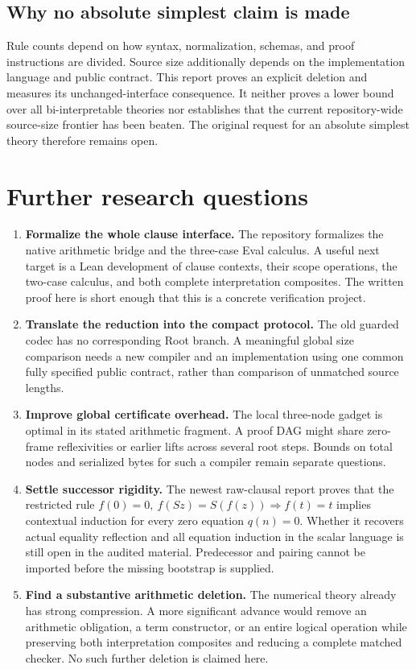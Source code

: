 \documentclass[11pt,letterpaper]{article}
\theoremstyle{definition}
\begin{document}
\subsection{Why no absolute simplest claim is made}

Rule counts depend on how syntax, normalization, schemas,
and proof instructions are divided. Source size additionally
depends on the implementation language and public contract.
This report proves an explicit deletion and measures its
unchanged-interface consequence. It neither proves a lower
bound over all bi-interpretable theories nor establishes that
the current repository-wide source-size frontier has been
beaten. The original request for an absolute simplest theory
therefore remains open.

\section{Further research questions}
\label{sec:further}

\begin{enumerate}
\item \textbf{Formalize the whole clause interface.}
      The repository formalizes the native arithmetic bridge
      and the three-case Eval calculus. A useful next target
      is a Lean development of clause contexts, their scope
      operations, the two-case calculus, and both complete
      interpretation composites. The written proof here is
      short enough that this is a concrete verification project.
\item \textbf{Translate the reduction into the compact protocol.}
      The old guarded codec has no corresponding Root branch.
      A meaningful global size comparison needs a new compiler
      and an implementation using one common fully specified
      public contract, rather than comparison of unmatched
      source lengths.
\item \textbf{Improve global certificate overhead.}
      The local three-node gadget is optimal in its stated
      arithmetic fragment. A proof DAG might share zero-frame
      reflexivities or earlier lifts across several root
      steps. Bounds on total nodes and serialized bytes for
      such a compiler remain separate questions.
\item \textbf{Settle successor rigidity.}
      The newest raw-clausal report proves that the restricted
      rule $f(0)=0,\ f(Sz)=S(f(z))\Rightarrow f(t)=t$
      implies contextual induction for every zero equation
      $q(n)=0$. Whether it recovers actual equality reflection
      and all equation induction in the scalar language is
      still open in the audited material. Predecessor and
      pairing cannot be imported before the missing bootstrap
      is supplied.
\item \textbf{Find a substantive arithmetic deletion.}
      The numerical theory already has strong compression.
      A more significant advance would remove an arithmetic
      obligation, a term constructor, or an entire logical
      operation while preserving both interpretation
      composites and reducing a complete matched checker.
      No such further deletion is claimed here.
\end{enumerate}
\end{document}
